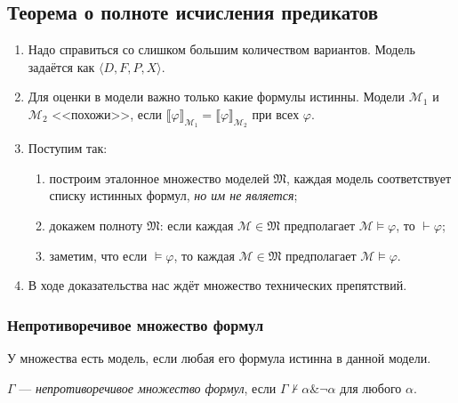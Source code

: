 \subsection{Теорема о полноте исчисления предикатов}
\begin{enumerate}
    \item Надо справиться со слишком большим количеством вариантов.
          Модель задаётся как $\langle D,F,P,X \rangle$.
    \item Для оценки в модели важно только какие формулы истинны.
          Модели $\mathcal{M}_1$ и $\mathcal{M}_2$ <<похожи>>, если
          $\llbracket \varphi \rrbracket_{\mathcal{M}_1} = \llbracket \varphi \rrbracket_{\mathcal{M}_2}$
          при всех $\varphi$.
    \item Поступим так:
        \begin{enumerate}
           \item построим эталонное множество моделей $\mathfrak{M}$, каждая модель соответствует списку истинных формул, \emph{но им не является};
           \item докажем полноту $\mathfrak{M}$: если каждая $\mathcal{M} \in \mathfrak{M}$ предполагает $\mathcal{M}\models\varphi$,
                 то $\vdash\varphi$;
           \item заметим, что если $\models\varphi$, то каждая $\mathcal{M} \in \mathfrak{M}$ предполагает $\mathcal{M}\models\varphi$.
        \end{enumerate}
    \item В ходе доказательства нас ждёт множество технических препятствий.
\end{enumerate}

\subsubsection{Непротиворечивое множество формул}
\begin{definition}
    У множества есть модель, если любая его формула истинна в данной модели.
\end{definition}

\begin{definition}
    $\Gamma$ --- \emph{непротиворечивое множество формул}, если $\Gamma\not\vdash\alpha\&\neg\alpha$ для любого $\alpha$.
\end{definition}

